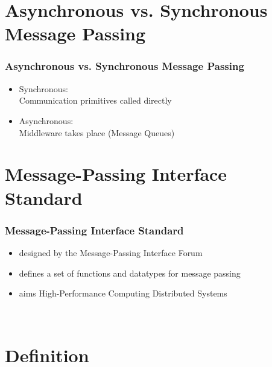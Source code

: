 \documentclass[aspectratio=169]{beamer}
\begin{document}
\section{Asynchronous vs. Synchronous Message Passing}
\begin{frame}

\frametitle{Asynchronous vs. Synchronous Message Passing}

\begin{itemize}
\item Synchronous: \\
Communication primitives called directly
\pause
\item Asynchronous: \\
Middleware takes place (Message Queues)
\end{itemize}

\begin{flushright}
\cite{tanenbaum}
\end{flushright}

\end{frame}

\section{Message-Passing Interface Standard}

\begin{frame}

\frametitle{Message-Passing Interface Standard}

\begin{itemize}
\item designed by the Message-Passing Interface Forum
\pause
\item defines a set of functions and datatypes for message passing
\pause
\item aims High-Performance Computing Distributed Systems
\end{itemize}

\begin{flushright}
\cite{mpi}\\
\cite{tanenbaum}
\end{flushright}

\end{frame}

\section{Definition}
\end{document}

